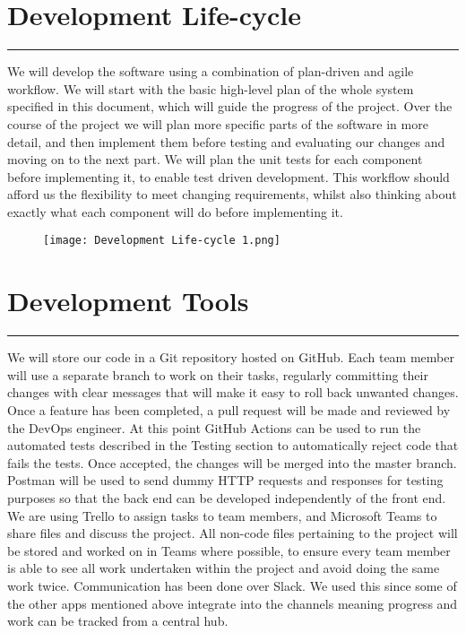 \documentclass{article}
\begin{document}
\section*{Development Life-cycle}
\hrule
\vspace{9pt}
We will develop the software using a combination of plan-driven and agile workflow. We will start with the basic high-level plan of the whole system specified in this document, which will guide the progress of the project. Over the course of the project we will plan more specific parts of the software in more detail, and then implement them before testing and evaluating our changes and moving on to the next part. We will plan the unit tests for each component before implementing it, to enable test driven development. This workflow should afford us the flexibility to meet changing requirements, whilst also thinking about exactly what each component will do before implementing it.
\begin{figure}[h]
    \centering
    \texttt{[image: Development Life-cycle 1.png]}
\end{figure}
\section*{Development Tools}
\hrule
\vspace{9pt}
We will store our code in a Git repository hosted on GitHub. Each team member will use a separate branch to work on their tasks, regularly committing their changes with clear messages that will make it easy to roll back unwanted changes. Once a feature has been completed, a pull request will be made and reviewed by the DevOps engineer.  At this point GitHub Actions can be used to run the automated tests described in the Testing section to automatically reject code that fails the tests. Once accepted, the changes will be merged into the master branch.
Postman will be used to send dummy HTTP requests and responses for testing purposes so that the back end can be developed independently of the front end.  
We are using Trello to assign tasks to team members, and Microsoft Teams to share files and discuss the project. All non-code files pertaining to the project will be stored and worked on in Teams where possible, to ensure every team member is able to see all work undertaken within the project and avoid doing the same work twice. 
Communication has been done over Slack. We used this since some of the other apps mentioned above integrate into the channels meaning progress and work can be tracked from a central hub.
\end{document}
